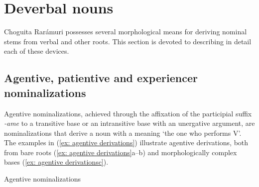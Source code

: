 \section{Deverbal nouns}
\label{sec: deverbal nouns}

Choguita Rarámuri possesses several morphological means for deriving nominal stems from verbal and other roots. This section is devoted to describing in detail each of these devices.

\subsection{Agentive, patientive and experiencer nominalizations}
\label{subsec: agentive, patientive and experiencer nominalizations}


Agentive nominalizations, achieved through the affixation of the participial suffix \textit{-ame} to a transitive base or an intransitive base with an unergative argument, are nominalizations that derive a noun with a meaning ‘the one who performs V’. The examples in (\ref{ex: agentive derivations}) illustrate agentive derivations, both from bare roots (\ref{ex: agentive derivations}a--b) and morphologically complex bases (\ref{ex: agentive derivationsc}).

\ea\label{ex: agentive derivations}
{Agentive nominalizations}\\

    \label{ex: agentive derivationsa}
        \label{ex: agentive derivationsb}
            \label{ex: agentive derivationsc}

